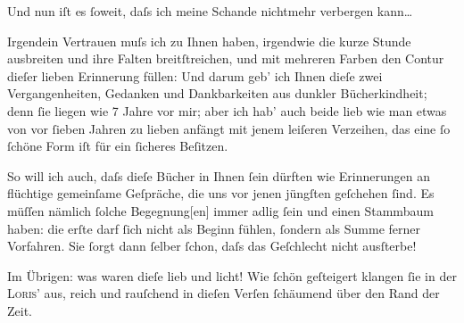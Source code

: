 \pstart
           Und nun iſt es{ }ſoweit, daſs ich meine Schande nichtmehr verbergen kann{\dots}{ }\pend
           
\pstart
           {\pb}Irgendein Vertrauen muſs ich zu Ihnen
               haben, irgendwie die kurze Stunde ausbreiten und ihre Falten breitſtreichen, und mit
               mehreren Farben den Contur dieſer lieben Erinnerung füllen: Und darum geb’ ich Ihnen
               dieſe zwei Vergangenheiten, Gedanken und Dankbarkeiten aus dunkler Bücherkindheit;
               denn{ }ſie liegen \introOben{}wie\introOben{} 7 Jahre vor mir; aber ich hab’ auch
               beide lieb wie man etwas von vor{ }ſieben Jahren zu lieben anfängt mit jenem leiſeren
               Verzeihen, das eine{ }ſo{ }ſchöne Form iſt für ein{ }ſicheres Beſitzen.\pend
           
\pstart
           So will ich auch, daſs dieſe Bücher in Ihnen{ }ſein dürften wie Erinnerungen an flüchtige
               gemeinſame Geſpräche, die uns vor jenen jüngſten geſchehen{ }ſind. Es müſſen {\pb}nämlich{ }ſolche
                  Begegnung{[}en{]} immer adlig{ }ſein und einen Stammbaum haben: die
               erſte darf{ }ſich nicht als Beginn fühlen,{ }ſondern als Summe ferner Vorfahren. Sie{ }ſorgt dann{ }ſelber{ }ſchon, daſs das Geſchlecht nicht ausſterbe!\pend
           
\pstart
           Im Übrigen: was waren dieſe \label{K_L04536-2v}\label{K_L04536-2} lieb und licht! Wie{ }ſchön geſteigert klangen{ }ſie in der
                  \label{K_L04536-3v}\label{K_L04536-3}{ }\textsc{Loris}’ aus, reich und rauſchend in dieſen Verſen{ }ſchäumend über den Rand der Zeit.\pend
           
